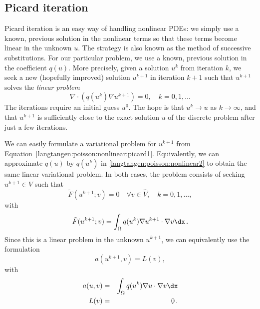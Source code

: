 \subsection{Picard iteration}
\label{langtangen:nonlinear:Picard}

Picard iteration is an easy way of handling nonlinear PDEs: we simply
use a known, previous solution in the nonlinear terms so that these
terms become linear in the unknown $u$. The strategy is also known as
the method of successive substitutions.
For our particular problem,
we use a known, previous solution in the coefficient $q(u)$.
More precisely, given a solution $u^k$ from iteration $k$, we seek a
new (hopefully improved) solution $u^{k+1}$ in iteration $k+1$ such
that $u^{k+1}$ solves the \emph{linear problem}
\begin{equation}
\label{langtangen:poisson:nonlinear:picard1}
\nabla\cdot \left(q(u^k)\nabla u^{k+1}\right) = 0,\quad k=0,1,\ldots
\end{equation}
The iterations require an initial guess $u^0$. 
The hope is that $u^{k} \rightarrow u$ as $k\rightarrow\infty$, and that
$u^{k+1}$ is sufficiently close to the exact
solution $u$ of the discrete problem after just a few iterations.

We can easily formulate a variational problem for $u^{k+1}$ from 
Equation~\eqref{langtangen:poisson:nonlinear:picard1}.
Equivalently, we can approximate $q(u)$ by $q(u^k)$ in
\eqref{langtangen:poisson:nonlinear2}
to obtain the same linear variational problem.
In both cases, the problem consists of seeking
$u^{k+1} \in V$ such that
\begin{equation} \label{langtangen:poisson:nonlinear:picard2}
  \tilde F(u^{k+1}; v) = 0 \quad \forall v \in \hat{V},\quad k=0,1,\ldots,
\end{equation}
with
\begin{equation}
\label{langtangen:poisson:nonlinear:picard3}
\tilde F(u^{k+1}; v) = \int_\Omega q(u^k)\nabla u^{k+1}\cdot \nabla v\dx
\langtangenep
\end{equation}
Since this is a linear problem in the unknown $u^{k+1}$, we can equivalently
use the formulation
\begin{equation}
a(u^{k+1},v) = L(v),
\end{equation}
with 
\begin{eqnarray}
a(u,v) &=& \int_\Omega q(u^k)\nabla u\cdot \nabla v\dx
\\
L(v) &=& 0\langtangenep
\end{eqnarray}

